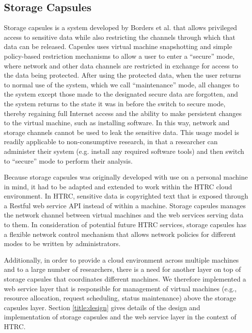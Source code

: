 \documentclass{acm_proc_article-sp}
\begin{document}
\subsection{Storage Capsules}

Storage capsules is a system developed by Borders et al.
\cite{Borders:2009:PCD:1855768.1855791} that allows privileged access to
sensitive data while also restricting the channels through which that data can
be released.  Capsules uses virtual machine snapshotting and simple
policy-based restriction mechanisms to allow a user to enter a ``secure'' mode,
where network and other data channels are restricted in exchange for access to
the data being protected.  After using the protected data, when the user
returns to normal use of the system, which we call ``maintenance'' mode, all
changes to the system except those made to the designated secure data are
forgotten, and the system returns to the state it was in before the switch to
secure mode, thereby regaining full Internet access and the ability to make
persistent changes to the virtual machine, such as installing software.  In
this way, network and storage channels cannot be used to leak the sensitive
data.  This usage model is readily applicable to non-consumptive research, in
that a researcher can administer their system (e.g. install any required
software tools) and then switch to ``secure'' mode to perform their analysis.  

Because storage capsules was originally developed with use on a personal
machine in mind, it had to be adapted and extended to work within the HTRC
cloud environment. In HTRC, sensitive data is copyrighted text that is exposed
through a Restful web service API instead of within a machine. Storage capsules
manages the network channel between virtual machines and the web services
serving data to them. In consideration of potential future HTRC services,
storage capsules has a flexible network control mechanism that allows network
policies for different modes to be written by administrators. 

Additionally, in order to provide a cloud environment across multiple machines
and to a large number of researchers, there is a need for another layer on top
of storage capsules that coordinates different machines. We therefore
implemented a web service layer that is responsible for management of virtual
machines (e.g., resource allocation, request scheduling, status maintenance)
above the storage capsules layer.  Section \ref{title:design} gives details of
the design and implementation of storage capsules and the web service layer in
the context of HTRC.
\end{document}
